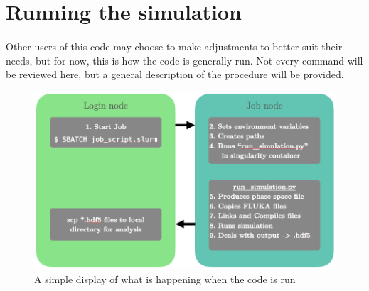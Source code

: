 \section{Running the simulation}

\paragraph{}
Other users of this code may choose to make adjustments to better suit their needs, but for now, this is how the code is generally run. Not every command will be reviewed here, but a general description of the procedure will be provided. 

\begin{figure}[h]
    \begin{center}
    \includegraphics[scale=0.5]{figures/nodes.png}
    \caption{A simple display of what is happening when the code is run}
    \label{fig:running}
    \end{center}
\end{figure}